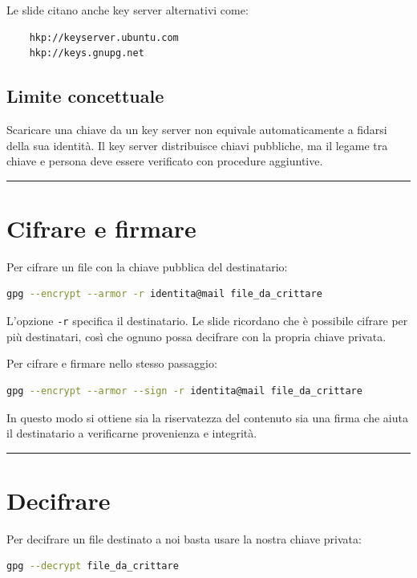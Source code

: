 \documentclass[12pt, a4paper]{report}
\begin{document}
Le slide citano anche key server alternativi come:
\begin{lstlisting}
	hkp://keyserver.ubuntu.com
	hkp://keys.gnupg.net
\end{lstlisting}

\subsection{Limite concettuale}
Scaricare una chiave da un key server non equivale automaticamente a fidarsi della sua identità. Il key server distribuisce chiavi pubbliche, ma il legame tra chiave e persona deve essere verificato con procedure aggiuntive.

\noindent\rule{\textwidth}{0.4pt}

\section{Cifrare e firmare}

Per cifrare un file con la chiave pubblica del destinatario:

\begin{lstlisting}[language=bash]
	gpg --encrypt --armor -r identita@mail file_da_crittare
\end{lstlisting}

L'opzione \texttt{-r} specifica il destinatario. Le slide ricordano che è possibile cifrare per più destinatari, così che ognuno possa decifrare con la propria chiave privata.

Per cifrare e firmare nello stesso passaggio:

\begin{lstlisting}[language=bash]
	gpg --encrypt --armor --sign -r identita@mail file_da_crittare
\end{lstlisting}

In questo modo si ottiene sia la riservatezza del contenuto sia una firma che aiuta il destinatario a verificarne provenienza e integrità.

\noindent\rule{\textwidth}{0.4pt}

\section{Decifrare}

Per decifrare un file destinato a noi basta usare la nostra chiave privata:

\begin{lstlisting}[language=bash]
	gpg --decrypt file_da_crittare
\end{lstlisting}
\end{document}
